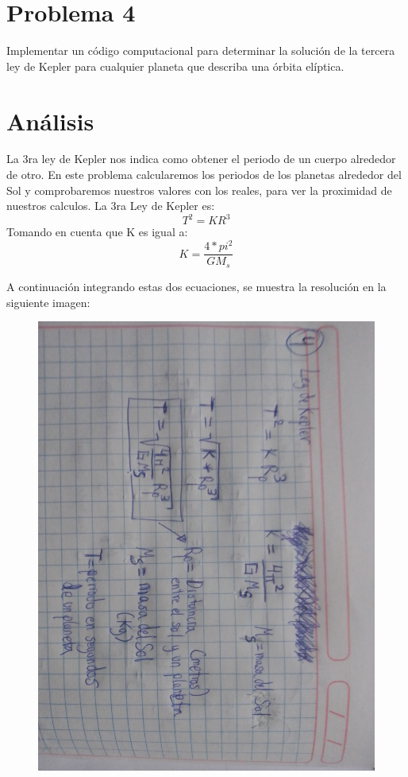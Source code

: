 \documentclass[a4paper,12pt]{article}
\begin{document}
    \section{Problema 4}
    Implementar un código computacional para 
    determinar la solución de la tercera ley de 
    Kepler para cualquier planeta que describa una órbita elíptica.
    \section{Análisis}
    La 3ra ley de Kepler nos indica como obtener el periodo de un cuerpo alrededor de otro.
    En este problema calcularemos los periodos de los planetas alrededor del Sol y comprobaremos
    nuestros valores con los reales, para ver la proximidad de nuestros calculos.
    La 3ra Ley de Kepler es:
    \begin{equation}
        T^2 = KR^3
    \end{equation}    
    Tomando en cuenta que K es igual a:
    \begin{equation}
        K = \frac{4*pi^2}{GM_s}
    \end{equation}

    A continuación integrando estas dos ecuaciones, se muestra la resolución
    en la siguiente imagen:
    \begin{figure}[!ht]
        \centering
        \includegraphics[scale=0.25,angle=90]{ejer4fc.jpg}        
    \end{figure}
\end{document}
